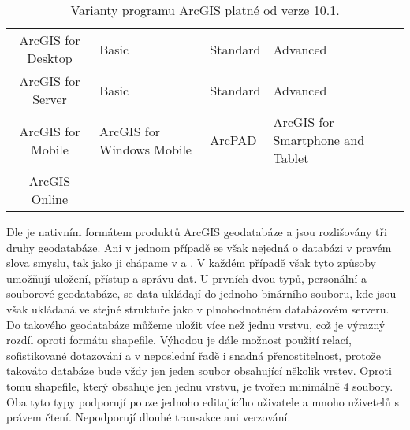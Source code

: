         \begin{table}[H]
          \caption{Varianty programu ArcGIS platné od verze 10.1.}
          \label{verzeArcGIS}
          \begin{footnotesize}
            \begin{center}
              \begin{tabular}{|>{\centering} c |>{\centering}m{9.5em}  m{8.5em}  <{\centering} m{11em}  <{\centering}|}
                \hline
                {\bf \color{purpurova7}Produkt}	& \multicolumn{3}{c|}{\bf \color{purpurova7}Verze} \\
                \hline
                ArcGIS for Desktop & Basic & Standard & Advanced \\
                 ArcGIS for Server &	Basic &	Standard &	Advanced \\
                 ArcGIS for Mobile &	ArcGIS for Windows Mobile &	ArcPAD &	ArcGIS for Smartphone and Tablet \\
                   ArcGIS Online   & & &	\\	
                \hline
              \end{tabular}
            \end{center}
          \end{footnotesize}
        \end{table}

Dle \cite{Law2008} je nativním formátem produktů ArcGIS geodatabáze a jsou rozlišovány tři druhy geodatabáze. Ani v jednom případě se však nejedná o databázi v pravém slova smyslu, tak jako ji chápame v  a . V každém případě však tyto způsoby umožňují uložení, přístup a správu dat. U prvních dvou typů, personální a souborové geodatabáze, se data ukládají do jednoho binárního souboru, kde jsou však ukládaná ve stejné struktuře jako v plnohodnotném databázovém serveru. Do takového geodatabáze můžeme uložit více než jednu vrstvu, což je výrazný rozdíl oproti formátu shapefile. Výhodou je dále možnost použití relací, sofistikované dotazování a v neposlední řadě i snadná přenostitelnost, protože takováto databáze bude vždy jen jeden soubor obsahující několik vrstev. Oproti tomu shapefile, který obsahuje jen jednu vrstvu, je tvořen minimálně 4 soubory. Oba tyto typy podporují pouze jednoho editujícího uživatele a mnoho uživetelů s právem čtení. Nepodporují dlouhé transakce ani verzování. 

